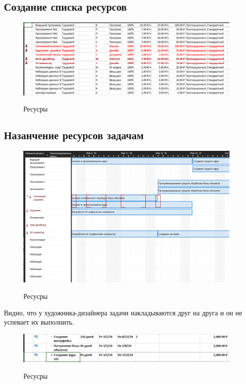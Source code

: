 \subsection{Создание списка ресурсов}

\begin{figure}[ht!]
	\includegraphics[width=0.75\linewidth]{assets/images/image_2024-02-27_09-33-23.png}
	\label{fig:r2}
	\caption{Ресусры}
\end{figure}
\FloatBarrier

\subsection{Назанчение ресурсов задачам}

\begin{figure}[ht!]
	\includegraphics[width=0.75\linewidth]{assets/images/image_2024-02-27_09-35-16.png}
	\label{fig:r2}
	\caption{Ресусры}
\end{figure}
\FloatBarrier

Видно, что у художника-дизайнера задачи накладываются друг на друга и он не успевает их выполнить.

\begin{figure}[ht!]
	\includegraphics[width=0.75\linewidth]{assets/images/image_2024-02-27_09-35-44.png}
	\label{fig:r2}
	\caption{Ресусры}
\end{figure}
\FloatBarrier

